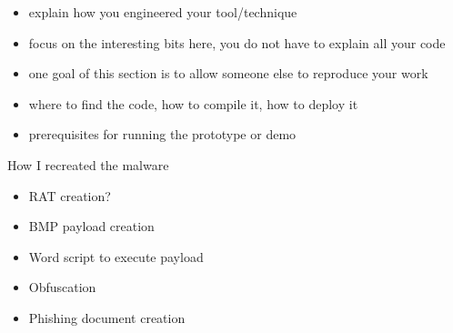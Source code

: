 \clearpage
\begin{itemize}
  \item explain how you engineered your tool/technique
  \item focus on the interesting bits here, you do not have to explain all your code
  \item one goal of this section is to allow someone else to reproduce your work
  \item where to find the code, how to compile it, how to deploy it
  \item prerequisites for running the prototype or demo
\end{itemize}
How I recreated the malware
\begin{itemize}
  \item RAT creation?
  \item BMP payload creation
  \item Word script to execute payload
  \item Obfuscation
  \item Phishing document creation
\end{itemize}
\clearpage
